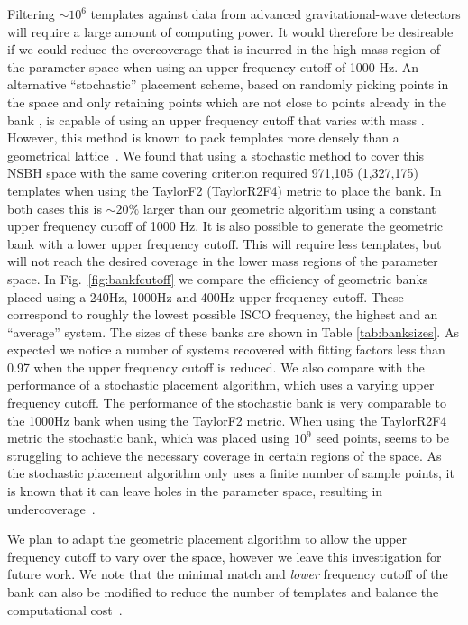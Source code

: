 Filtering ${\sim}10^6$ templates against data from advanced
gravitational-wave detectors will require a large amount of computing power. It
would therefore be desireable if we could reduce the overcoverage that
is incurred in the high mass region of the parameter space when using an upper
frequency cutoff of 1000 Hz. An alternative ``stochastic'' placement scheme,
based on randomly picking points in the space and only retaining points which
are not close to points already in the bank
\cite{Harry:2009ea,Babak:2008rb,Manca:2009xw}, is capable of using an upper
frequency cutoff that varies with mass \cite{Ajith:2012mn}. However, this
method is known to pack templates more densely than a geometrical
lattice~\cite{Harry:2009ea}.
We found that using a stochastic method to cover this \ac{NSBH} space with the
same covering criterion required 971,105 (1,327,175) templates when using
the TaylorF2 (TaylorR2F4) metric to place the bank. In both cases this is $\sim
20\%$ larger than our geometric algorithm using a constant upper frequency
cutoff of 1000 Hz. It is also possible to generate the geometric bank with a
lower upper frequency cutoff. This will require less
templates, but will not reach the desired coverage in the lower mass regions of
the parameter space. In Fig.~\ref{fig:bankfcutoff} we compare the efficiency
of geometric banks placed using a 240Hz, 1000Hz and 400Hz upper frequency
cutoff. These correspond to roughly the lowest possible \ac{ISCO}
frequency, the highest and an ``average'' system. The sizes of these banks are
shown in Table \ref{tab:banksizes}. As expected we notice a number of systems
recovered with fitting factors less than 0.97 when the upper frequency cutoff is
reduced. We also compare with the performance of a
stochastic placement algorithm, which uses a varying upper frequency cutoff.
The performance of the
stochastic bank is very comparable to the 1000Hz bank when using the TaylorF2
metric. When using the TaylorR2F4 metric  the stochastic bank, which was placed
using $10^9$ seed points, seems to be struggling to achieve the necessary
coverage in certain regions of the space. As the stochastic placement algorithm
only uses a finite number of sample points, it is known that it can leave holes
in the parameter space, resulting in undercoverage~\cite{Harry:2009ea}.

We plan to adapt the geometric placement algorithm to allow the upper frequency
cutoff to vary over the space, however we leave this investigation for future
work. We note that the minimal match and \emph{lower} frequency cutoff of the
bank can also be modified to reduce the number of templates and balance the
computational cost~\cite{Keppel:2013yia}.

